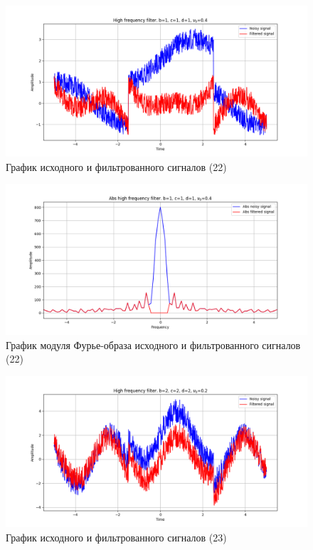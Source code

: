 \documentclass[a4paper, 12pt]{article}
\begin{document}
    \begin{figure}[!htb]
        \centering
        \includegraphics[scale=0.48]{22_u_flt_u_nolow.png}
        \captionsetup{skip=0pt}
        \caption{График исходного и фильтрованного сигналов (22)}
        \label{fig:fig_a}
    \end{figure}
    \begin{figure}[!htb]
        \centering
        \includegraphics[scale=0.48]{22_abs_u_U_nolow.png}
        \captionsetup{skip=0pt}
        \caption{График модуля Фурье-образа исходного и фильтрованного сигналов (22)}
        \label{fig:fig_b}
    \end{figure}
    \newpage
    \begin{figure}[!htb]
        \centering
        \includegraphics[scale=0.48]{23_u_flt_u_nolow.png}
        \captionsetup{skip=0pt}
        \caption{График исходного и фильтрованного сигналов (23)}
        \label{fig:fig_c}
    \end{figure}
\end{document}
